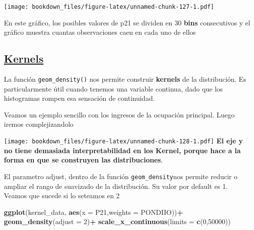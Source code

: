\documentclass[]{book}
\newenvironment{Shaded}{\begin{snugshade}}{\end{snugshade}}
\newcommand{\DataTypeTok}[1]{\textcolor[rgb]{0.13,0.29,0.53}{#1}}
\newcommand{\DecValTok}[1]{\textcolor[rgb]{0.00,0.00,0.81}{#1}}
\newcommand{\KeywordTok}[1]{\textcolor[rgb]{0.13,0.29,0.53}{\textbf{#1}}}
\newcommand{\NormalTok}[1]{#1}
\newcommand{\OperatorTok}[1]{\textcolor[rgb]{0.81,0.36,0.00}{\textbf{#1}}}
\newcommand{\StringTok}[1]{\textcolor[rgb]{0.31,0.60,0.02}{#1}}
\begin{document}
\texttt{[image: bookdown\_files/figure-latex/unnamed-chunk-127-1.pdf]}

En este gráfico, los posibles valores de p21 se dividen en 30 \textbf{bins} consecutivos y el gráfico muestra cuantas observaciones caen en cada uno de ellos

\hypertarget{kernels}{%
\subsection{\texorpdfstring{\href{https://plot.ly/ggplot2/geom_density/}{Kernels}}{Kernels}}\label{kernels}}

La función \texttt{geom\_density()} nos permite construir \textbf{kernels} de la distribución. Es particularmente útil cuando tenemos una variable continua, dado que los histogramas rompen esa sensación de continuidad.

Veamos un ejemplo sencillo con los ingresos de la ocupación principal. Luego iremos complejizandolo

\begin{Shaded}
\end{Shaded}

\texttt{[image: bookdown\_files/figure-latex/unnamed-chunk-128-1.pdf]}
\textbf{El eje y no tiene demasiada interpretabilidad en los Kernel, porque hace a la forma en que se construyen las distribuciones}.

El parametro adjust, dentro de la función \texttt{geom\_density}nos permite reducir o ampliar el rango de suavizado de la distribución. Su valor por default es 1. Veamos que sucede si lo seteamos en 2

\begin{Shaded}
\begin{Highlighting}[]
\KeywordTok{ggplot}\NormalTok{(kernel_data, }\KeywordTok{aes}\NormalTok{(}\DataTypeTok{x =}\NormalTok{ P21,}\DataTypeTok{weights =}\NormalTok{ PONDIIO))}\OperatorTok{+}\StringTok{ }
\KeywordTok{geom_density}\NormalTok{(}\DataTypeTok{adjust =} \DecValTok{2}\NormalTok{)}\OperatorTok{+}
\KeywordTok{scale_x_continuous}\NormalTok{(}\DataTypeTok{limits =} \KeywordTok{c}\NormalTok{(}\DecValTok{0}\NormalTok{,}\DecValTok{50000}\NormalTok{))}
\end{Highlighting}
\end{Shaded}
\end{document}
